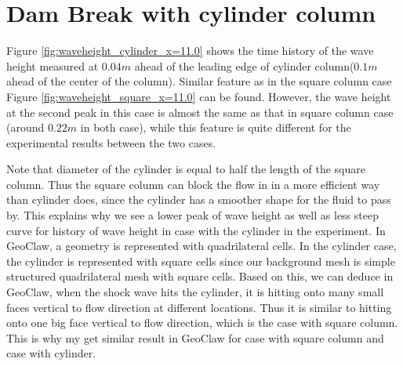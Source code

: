 \documentclass[11pt]{article}
\begin{document}
\section{Dam Break with cylinder column}\label{Sec:Cylinder}
Figure \ref{fig:waveheight_cylinder_x=11.0} shows the time history of the wave height measured at $0.04m$ ahead of the leading edge of cylinder column($0.1m$ ahead of the center of the column).
Similar feature as in the square column case Figure \ref{fig:waveheight_square_x=11.0} can be found.
However, the wave height at the second peak in this case is almost the same as that in square column case (around $0.22m$ in both case), while this feature is quite different for the experimental results between the two cases.
\par
Note that diameter of the cylinder is equal to half the length of the square column. Thus the square column can block the flow in in a more efficient way than cylinder does, since the cylinder has a smoother shape for the fluid to pass by. 
This explains why we see a lower peak of wave height as well as less steep curve for history of wave height in case with the cylinder in the experiment. 
In GeoClaw, a geometry is represented with quadrilateral cells. In the cylinder case, the cylinder is represented with square cells since our background mesh is simple structured quadrilateral mesh with square cells.
Based on this, we can deduce in GeoClaw, when the shock wave hits the cylinder, it is hitting onto many small faces vertical to flow direction at different locations. 
Thus it is similar to hitting onto one big face vertical to flow direction, which is the case with square column.  
This is why my get similar result in GeoClaw for case with square column and case with cylinder.
\end{document}
